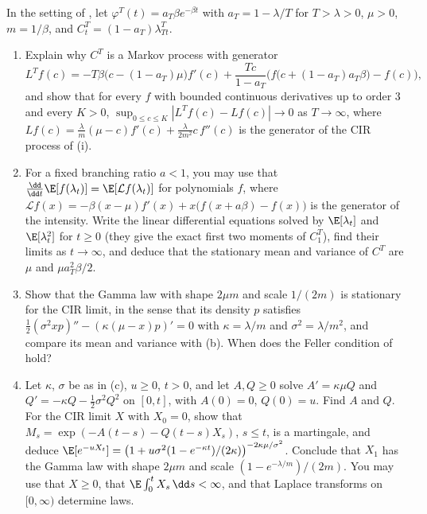 \begin{exercise}\label{ex:hk-cir}
\hard In the setting of , let $\varphi^T(t)=a_T\beta e^{-\beta t}$ with $a_T=1-\lambda/T$ for $T>\lambda>0$,
$\mu>0$, $m=1/\beta$, and $C^T_t=(1-a_T)\lambda^T_{Tt}$.
\begin{enumerate}[label=(\alph*)]
  \item Explain why $C^T$ is a Markov process with generator
    \[
      L^Tf(c)=-T\beta\big(c-(1-a_T)\mu\big)f'(c)+\frac{Tc}{1-a_T}\Big(f\big(c+(1-a_T)a_T\beta\big)-f(c)\Big),
    \]
    and show that for every $f$ with bounded continuous derivatives up to order $3$ and every $K>0$,
    $\sup_{0\le c\le K}|L^Tf(c)-Lf(c)|\to0$ as $T\to\infty$, where
    $Lf(c)=\frac\lambda m(\mu-c)f'(c)+\frac\lambda{2m^2}c\,f''(c)$ is the generator of the CIR process of
    (i).
  \item For a fixed branching ratio $a<1$, you may use that $\frac{\dd}{\dd t}\E[f(\lambda_t)]=\E[\mathcal Lf(\lambda_t)]$
    for polynomials $f$, where $\mathcal Lf(x)=-\beta(x-\mu)f'(x)+x\big(f(x+a\beta)-f(x)\big)$ is the generator of the
    intensity. Write the linear differential equations solved by $\E[\lambda_t]$ and $\E[\lambda_t^2]$ for $t\ge0$ (they give
    the exact first two moments of $C^T_1$), find their limits as $t\to\infty$, and deduce that the stationary mean and
    variance of $C^T$ are $\mu$ and $\mu a_T^2\beta/2$.
  \item Show that the Gamma law with shape $2\mu m$ and scale $1/(2m)$ is stationary for the CIR limit, in the sense
    that its density $p$ satisfies $\frac12(\sigma^2xp)''-(\kappa(\mu-x)p)'=0$ with $\kappa=\lambda/m$ and
    $\sigma^2=\lambda/m^2$, and compare its mean and variance with (b). When does the Feller condition of
     hold?
  \item Let $\kappa$, $\sigma$ be as in (c), $u\ge0$, $t>0$, and let $A,Q\ge0$ solve $A'=\kappa\mu Q$ and
    $Q'=-\kappa Q-\frac12\sigma^2Q^2$ on $[0,t]$, with $A(0)=0$, $Q(0)=u$. Find $A$ and $Q$. For the CIR limit $X$ with
    $X_0=0$, show that $M_s=\exp(-A(t-s)-Q(t-s)X_s)$, $s\le t$, is a martingale, and deduce
    $\E[e^{-uX_t}]=\big(1+u\sigma^2(1-e^{-\kappa t})/(2\kappa)\big)^{-2\kappa\mu/\sigma^2}$. Conclude that $X_1$ has the Gamma law
    with shape $2\mu m$ and scale $(1-e^{-\lambda/m})/(2m)$. You may use that $X\ge0$, that
    $\E\int_0^tX_s\,\dd s<\infty$, and that Laplace transforms on $[0,\infty)$ determine laws.
\end{enumerate}
\end{exercise}

